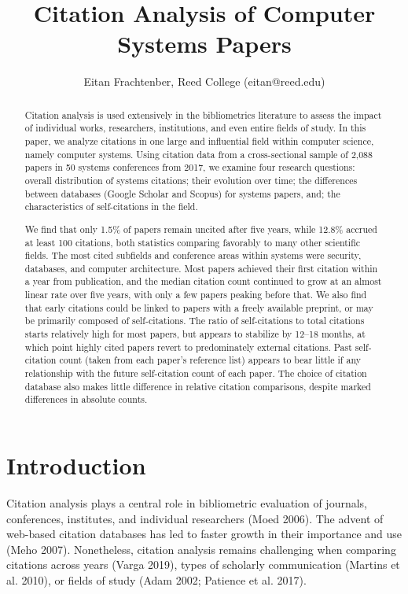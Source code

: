 \documentclass{article}
\title{Citation Analysis of Computer Systems Papers}
\author{ Eitan Frachtenber, Reed College (eitan@reed.edu) }
\begin{document}
\maketitle


\begin{abstract}
Citation analysis is used extensively in the bibliometrics literature to assess the impact of individual works, researchers, institutions, and even entire fields of study.
In this paper, we analyze citations in one large and influential field within computer science, namely computer systems. Using citation data from a cross-sectional sample of 2,088 papers in 50 systems conferences from 2017, we examine four research questions: overall distribution of systems citations; their evolution over time; the differences between databases (Google Scholar and Scopus) for systems papers, and; the characteristics of self-citations in the field.

We find that only 1.5\% of papers remain uncited after five years, while 12.8\% accrued at least 100 citations, both statistics comparing favorably to many other scientific fields.
The most cited subfields and conference areas within systems were security, databases, and computer architecture.
Most papers achieved their first citation within a year from publication, and the median citation count continued to grow at an almost linear rate over five years, with only a few papers peaking before that.
We also find that early citations could be linked to papers with a freely available preprint, or may be primarily composed of self-citations.
The ratio of self-citations to total citations starts relatively high for most papers, but appears to stabilize by 12--18 months, at which point highly cited papers revert to predominately external citations.
Past self-citation count (taken from each paper's reference list) appears to bear little if any relationship with the future self-citation count of each paper.
The choice of citation database also makes little difference in relative citation comparisons, despite marked differences in absolute counts.
\end{abstract}


\hypertarget{introduction}{%
\section{Introduction}\label{introduction}}

Citation analysis plays a central role in bibliometric evaluation of journals, conferences, institutes, and individual researchers (Moed 2006).
The advent of web-based citation databases has led to faster growth in their importance and use (Meho 2007).
Nonetheless, citation analysis remains challenging when comparing citations across years (Varga 2019), types of scholarly communication (Martins et al. 2010), or fields of study (Adam 2002; Patience et al. 2017).
\end{document}
